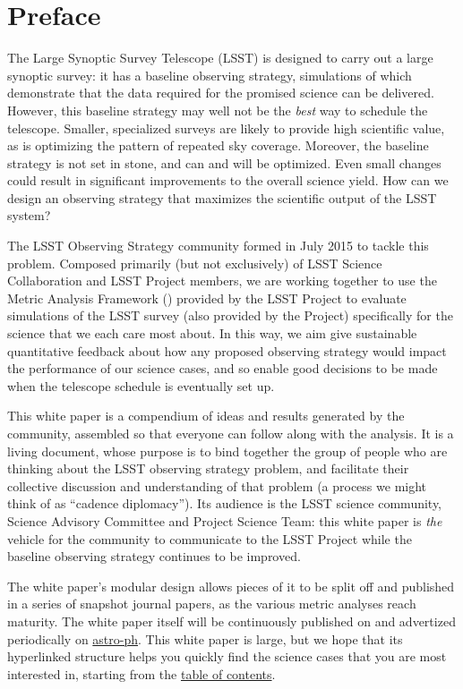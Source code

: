 \setcounter{chapter}{0}
\chapter*{Preface}
\def\chpname{preface}\label{chp:\chpname}
\markboth{}{}

\noindent The Large Synoptic Survey Telescope (LSST) is designed to
carry out a large synoptic survey: it has a baseline observing strategy, simulations of which demonstrate that the data required for
the promised science can be delivered.
However, this baseline strategy may well not be the {\it
best} way to schedule the telescope. Smaller, specialized surveys are
likely to provide high scientific value, as is optimizing the pattern of
repeated sky coverage.  Moreover, the baseline strategy is not set in
stone, and can and will be optimized. Even small changes could result in
significant improvements to the overall science yield. How can we design
an observing strategy that maximizes the scientific output of the LSST
system?

\noindent The LSST Observing Strategy community formed in July 2015 to
tackle this problem. Composed primarily (but not exclusively) of  LSST
Science Collaboration and LSST Project members, we are working together
to use the Metric Analysis Framework (\MAF) provided by the LSST Project
to evaluate simulations of the LSST survey (also provided by the
Project) specifically for the science that we each care most about. In
this way, we aim give sustainable quantitative feedback about how any
proposed observing strategy would impact the performance of our science
cases, and so enable good decisions to be made when the telescope
schedule is eventually set up.

\noindent This white paper is a compendium of ideas and results
generated by the community, assembled so that everyone can follow along
with the analysis. It is a living document, whose purpose is to bind
together the group of people who are thinking about the LSST observing
strategy problem, and facilitate their collective discussion and
understanding of that problem (a process we might think of as  ``cadence
diplomacy''). Its audience is the LSST science community, Science
Advisory Committee and Project Science Team: this white paper is   {\it
the} vehicle for the community to communicate to the LSST Project while
the baseline observing strategy continues to be improved.

\noindent The white paper's modular design allows pieces of it to be
split off and published in a series of snapshot journal papers, as the
various metric analyses reach maturity. The white paper itself will be
continuously published on
\href{https://github.com/LSSTScienceCollaborations/ObservingStrategy}{\GitHub}
and advertized periodically on \href{http://arxiv.org}{astro-ph}. This
white paper is large, but we hope that its hyperlinked structure helps
you quickly find the science cases that you are most interested in,
starting from the \hyperref[toc]{table of contents}.

